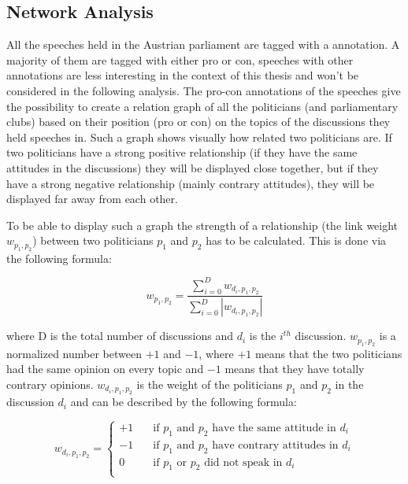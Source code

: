 \subsection{Network Analysis}
\label{sec:network_analysis}
All the speeches held in the Austrian parliament are tagged with a annotation. A majority of them are tagged with either pro or con, speeches with other annotations are less interesting in the context of this thesis and won't be considered in the following analysis. The pro-con annotations of the speeches give the possibility to create a relation graph of all the politicians (and parliamentary clubs) based on their position (pro or con) on the topics of the discussions they held speeches in. Such a graph shows visually how related two politicians are. If two politicians have a strong positive relationship (if they have the same attitudes in the discussions) they will be displayed close together, but if they have a strong negative relationship (mainly contrary attitudes), they will be displayed far away from each other.

To be able to display such a graph the strength of a relationship (the link weight $w_{p_1,p_2}$) between two politicians $p_1$ and $p_2$ has to be calculated. This is done via the following formula:

$$w_{p_1,p_2} = \frac{\displaystyle\sum_{i=0}^{D} w_{d_i,p_1,p_2}}{\displaystyle\sum_{i=0}^{D} |w_{d_i,p_1,p_2}|}$$

where D is the total number of discussions and $d_i$ is the $i^{th}$ discussion. $w_{p_1,p_2}$ is a normalized number between $+1$ and $-1$, where $+1$ means that the two politicians had the same opinion on every topic and $-1$ means that they have totally contrary opinions. $w_{d_i,p_1,p_2}$ is the weight of the politicians $p_1$ and $p_2$ in the discussion $d_i$ and can be described by the following formula:

$$w_{d_i,p_1,p_2} = 
\begin{cases}
    +1       & \quad \text{if } p_1 \text{ and } p_2 \text{ have the same attitude in } d_i\\
    -1  & \quad \text{if } p_1 \text{ and } p_2 \text{ have contrary attitudes in } d_i\\
        0       & \quad \text{if } p_1 \text{ or } p_2 \text{ did not speak in } d_i\\
\end{cases}
$$










